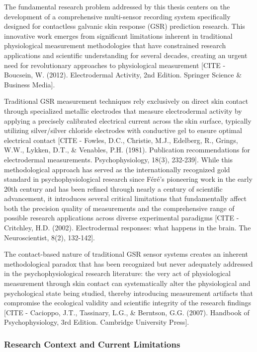 \documentclass[12pt,a4paper]{report}
\begin{document}
The fundamental research problem addressed by this thesis centers on the development of a comprehensive multi-sensor
recording system specifically designed for contactless galvanic skin response (GSR) prediction research. This innovative
work emerges from significant limitations inherent in traditional physiological measurement methodologies that have
constrained research applications and scientific understanding for several decades, creating an urgent need for
revolutionary approaches to physiological
measurement [CITE - Boucsein, W. (2012). Electrodermal Activity, 2nd Edition. Springer Science \& Business Media].

Traditional GSR measurement techniques rely exclusively on direct skin contact through specialized metallic electrodes
that measure electrodermal activity by applying a precisely calibrated electrical current across the skin surface,
typically utilizing silver/silver chloride electrodes with conductive gel to ensure optimal electrical
contact [CITE - Fowles, D.C., Christie, M.J., Edelberg, R., Grings, W.W., Lykken, D.T., \& Venables, P.H. (1981). Publication recommendations for electrodermal measurements. Psychophysiology, 18(3), 232-239].
While this methodological approach has served as the internationally recognized gold standard in psychophysiological
research since Féré's pioneering work in the early 20th century and has been refined through nearly a century of
scientific advancement, it introduces several critical limitations that fundamentally affect both the precision quality
of measurements and the comprehensive range of possible research applications across diverse experimental
paradigms [CITE - Critchley, H.D. (2002). Electrodermal responses: what happens in the brain. The Neuroscientist, 8(2), 132-142].

The contact-based nature of traditional GSR sensor systems creates an inherent methodological paradox that has been
recognized but never adequately addressed in the psychophysiological research literature: the very act of physiological
measurement through skin contact can systematically alter the physiological and psychological state being studied,
thereby introducing measurement artifacts that compromise the ecological validity and scientific integrity of the
research
findings [CITE - Cacioppo, J.T., Tassinary, L.G., \& Berntson, G.G. (2007). Handbook of Psychophysiology, 3rd Edition. Cambridge University Press].

\subsubsection{Research Context and Current Limitations}
\end{document}
